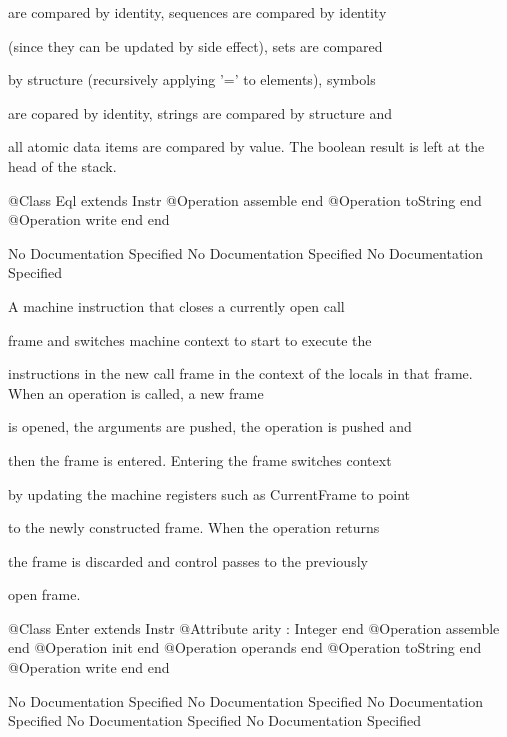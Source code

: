       are compared by identity, sequences are compared by identity

      (since they can be updated by side effect), sets are compared

      by structure (recursively applying '=' to elements), symbols

      are copared by identity, strings are compared by structure and

      all atomic data items are compared by value.
      The boolean result is left at the head of the stack.
\begin{Interface}
@Class Eql extends Instr
  @Operation assemble end
  @Operation toString end
  @Operation write end
end
\end{Interface}
No Documentation Specified
No Documentation Specified
No Documentation Specified

      A machine instruction that closes a currently open call

      frame and switches machine context to start to execute the

      instructions in the new call frame in the context of the 
      locals in that frame. When an operation is called, a new frame

      is opened, the arguments are pushed, the operation is pushed and

      then the frame is entered. Entering the frame switches context

      by updating the machine registers such as CurrentFrame to point

      to the newly constructed frame. When the operation returns

      the frame is discarded and control passes to the previously

      open frame.
\begin{Interface}
@Class Enter extends Instr
  @Attribute arity : Integer end
  @Operation assemble end
  @Operation init end
  @Operation operands end
  @Operation toString end
  @Operation write end
end
\end{Interface}
No Documentation Specified
No Documentation Specified
No Documentation Specified
No Documentation Specified
No Documentation Specified


